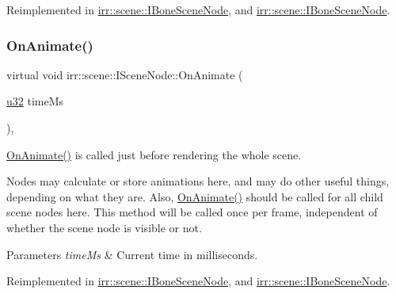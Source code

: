 Reimplemented in \hyperlink{classirr_1_1scene_1_1IBoneSceneNode_a7e21d0722e5b105e4d2a956bff110a7f}{irr\+::scene\+::\+I\+Bone\+Scene\+Node}, and \hyperlink{classirr_1_1scene_1_1IBoneSceneNode_a7e21d0722e5b105e4d2a956bff110a7f}{irr\+::scene\+::\+I\+Bone\+Scene\+Node}.

\mbox{\label{classirr_1_1scene_1_1ISceneNode_afc1dcb5cb19116d0c7aa3d4ebdf04cc5}} 
\subsubsection{\texorpdfstring{On\+Animate()}{OnAnimate()}\hspace{0.1cm}{\footnotesize\ttfamily [2/2]}}
{\footnotesize\ttfamily virtual void irr\+::scene\+::\+I\+Scene\+Node\+::\+On\+Animate (\begin{DoxyParamCaption}\item[{\hyperlink{namespaceirr_a0416a53257075833e7002efd0a18e804}{u32}}]{time\+Ms }\end{DoxyParamCaption})\hspace{0.3cm}{\ttfamily [inline]}, {\ttfamily [virtual]}}



\hyperlink{classirr_1_1scene_1_1ISceneNode_afc1dcb5cb19116d0c7aa3d4ebdf04cc5}{On\+Animate()} is called just before rendering the whole scene. 

Nodes may calculate or store animations here, and may do other useful things, depending on what they are. Also, \hyperlink{classirr_1_1scene_1_1ISceneNode_afc1dcb5cb19116d0c7aa3d4ebdf04cc5}{On\+Animate()} should be called for all child scene nodes here. This method will be called once per frame, independent of whether the scene node is visible or not. 
\begin{DoxyParams}{Parameters}
{\em time\+Ms} & Current time in milliseconds. \\
\hline
\end{DoxyParams}


Reimplemented in \hyperlink{classirr_1_1scene_1_1IBoneSceneNode_a7e21d0722e5b105e4d2a956bff110a7f}{irr\+::scene\+::\+I\+Bone\+Scene\+Node}, and \hyperlink{classirr_1_1scene_1_1IBoneSceneNode_a7e21d0722e5b105e4d2a956bff110a7f}{irr\+::scene\+::\+I\+Bone\+Scene\+Node}.

